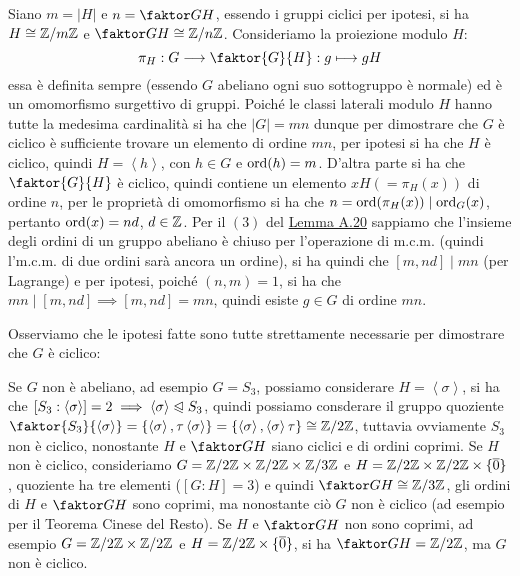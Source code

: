 \documentclass[11pt]{scrartcl}
\begin{document}
\begin{soln}
Siano $m = |H|$ e $n = \faktor GH$, essendo i gruppi ciclici per ipotesi, si ha $H \cong {\mathbb Z}/m{\mathbb Z}$  e 
$\faktor GH \cong \Zn$. Consideriamo la proiezione modulo $H$:
	\[ \pi_H : G \longrightarrow \faktor{G}{H} : g \longmapsto gH
	\]
essa è definita sempre (essendo $G$ abeliano ogni suo sottogruppo è normale) ed è un omomorfismo surgettivo
di gruppi. Poiché le classi laterali modulo $H$ hanno tutte la medesima cardinalità si ha che $|G| = mn$ 
dunque per dimostrare che $G$ è ciclico è sufficiente trovare un elemento di ordine $mn$, per ipotesi si ha che
$H$ è ciclico, quindi $H = \left<h\right>$, con $h \in G$ e $\operatorname{ord}(h) = m$. D'altra parte si ha che $\faktor{G}{H}$ è ciclico,
quindi contiene un elemento $xH (= \pi_H(x))$ di ordine $n$, per le proprietà di omomorfismo si ha che $n = \operatorname{ord}(\pi_H(x)) \mid \operatorname{ord}_G(x)$,
pertanto $\operatorname{ord}(x) = nd$, $d \in \mathbb Z$. Per il $(3)$ del \hyperref[A.20]{Lemma A.20} sappiamo che l'insieme degli ordini di un gruppo abeliano 
è chiuso per l'operazione di m.c.m. (quindi l'm.c.m. di due ordini sarà ancora un ordine), si ha quindi che $[m,nd] \mid mn$ (per Lagrange) e
per ipotesi, poiché $(n,m) = 1$, si ha che $mn \mid [m,nd] \implies [m,nd] = mn$, quindi esiste $g \in G$ di ordine $mn$.
\end{soln}

\begin{remark}
	Osserviamo che le ipotesi fatte sono tutte strettamente necessarie per dimostrare che $G$ è ciclico:
	\begin{itemize}
		\ii Se $G$ non è abeliano, ad esempio $G = S_3$, possiamo considerare $H = \left<\sigma\right>$,
		si ha che $[S_3 : \left<\sigma\right>] = 2 \implies \left<\sigma\right> \trianglelefteqslant S_3$, 
		quindi possiamo consderare il gruppo quoziente $\faktor{S_3}{\left<\sigma\right>} = \{ \left<\sigma\right>, \tau\left<\sigma\right>\} = 
		\{ \left<\sigma\right>, \left<\sigma\right>\tau\} \cong \Z2$, tuttavia ovviamente $S_3$ non è ciclico, nonostante $H$ e $\faktor GH$ siano ciclici e
		di ordini coprimi.
		\ii Se $H$ non è ciclico, consideriamo $G = \mathbb{Z}/{2}\mathbb{Z} \times \mathbb{Z}/{2}\mathbb{Z} \times \mathbb{Z}/{3}\mathbb{Z}$ e $H = \mathbb{Z}/{2}\mathbb{Z} \times \mathbb{Z}/{2}\mathbb{Z} \times \{\overline 0\}$, quoziente ha tre elementi ($[G:H] = 3$) e quindi
		$\faktor GH \cong \Z3$, gli ordini di $H$ e $\faktor GH$ sono coprimi, ma nonostante ciò $G$ non è ciclico (ad esempio per il Teorema Cinese del Resto).
		\ii Se $H$ e $\faktor GH$ non sono coprimi, ad esempio $G = \mathbb{Z}/{2}\mathbb{Z} \times \mathbb{Z}/{2}\mathbb{Z}$ e $H = \mathbb{Z}/{2}\mathbb{Z} \times \{\overline 0\}$, si ha  $\faktor GH = \Z2$, ma $G$ non è ciclico.
	\end{itemize}
\end{remark}
\end{document}
